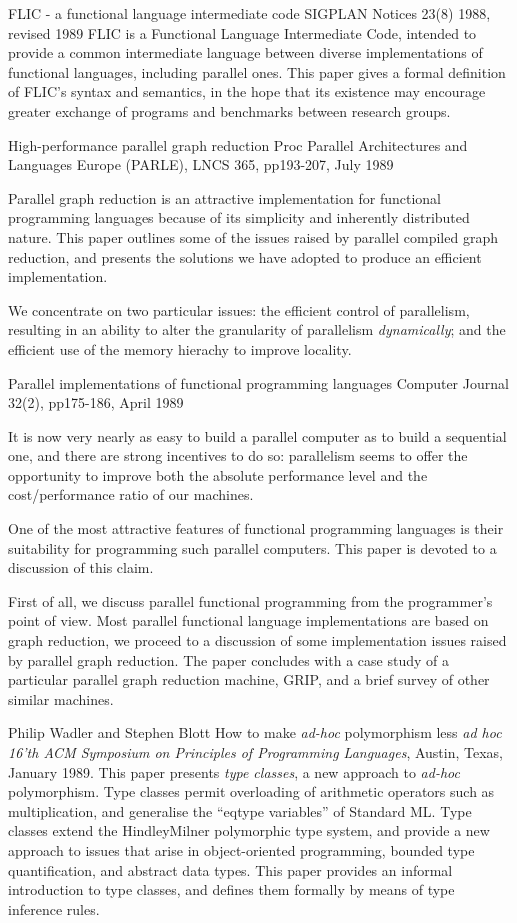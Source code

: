 {FLIC - a functional language intermediate code}
{SIGPLAN Notices 23(8) 1988, revised 1989}
{
FLIC is a Functional Language Intermediate Code, intended to
provide a common intermediate language between diverse
implementations of functional languages, including parallel
ones.
This paper gives a formal definition of FLIC's syntax and
semantics, in the hope that its existence may encourage greater
exchange of programs and benchmarks between research groups.
}

{High-performance parallel graph reduction}
{Proc Parallel Architectures and Languages Europe (PARLE), LNCS 365, pp193-207, 
July 1989}
{
Parallel graph reduction is an attractive implementation for functional 
programming languages because of its simplicity and inherently distributed
nature.
This paper outlines some of the issues raised by parallel compiled
graph reduction, and presents the solutions we have adopted to produce an
efficient implementation.

We concentrate on two particular issues:
the efficient control of parallelism, resulting in an ability to alter
the granularity of parallelism 
{\em dynamically};
and the efficient use of the memory hierachy to improve locality.
}

{Parallel implementations of functional programming languages}
{Computer Journal 32(2), pp175-186, April 1989}
{
It is now very nearly as easy to build a parallel computer
as to build a sequential one, and there are strong incentives to do so:
parallelism seems to offer the opportunity to improve both the 
absolute performance level and the cost/performance ratio of our machines.

One of the most attractive features of functional programming languages
is their suitability for programming such parallel computers.
This paper is devoted to a discussion of this claim.

First of all, we discuss parallel functional programming
from the programmer's point of view.
Most parallel functional language implementations are based on graph reduction,
we proceed to a discussion of some implementation issues raised by parallel 
graph reduction.
The paper concludes with a case study of a particular parallel graph reduction
machine, GRIP, and a brief survey of other similar machines.
}
{Philip Wadler and Stephen Blott}
{How to make {\em ad-hoc\/} polymorphism less {\em ad hoc}}
{{\em 16'th ACM Symposium on Principles of Programming Languages},
Austin, Texas, January 1989.}
{
This paper presents {\em type classes}, a new approach to {\em
ad-hoc\/} polymorphism.  Type classes permit overloading of arithmetic
operators such as multiplication, and generalise the ``eqtype variables''
of Standard ML.
Type classes extend the Hindley\X Milner polymorphic type system, and
provide a new approach to issues that arise in object-oriented
programming, bounded type quantification, and abstract data types.
This paper provides an informal introduction to type classes, and
defines them formally by means of type inference rules.
}

